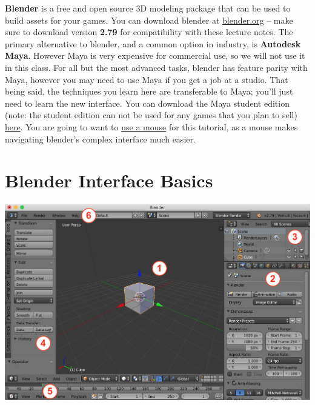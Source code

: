 \documentclass[11pt]{article}
\begin{document}
\textbf{Blender} is a free and open source 3D modeling package that can be used to build assets for
your games.  You can download blender at \href{https://blender.org}{blender.org} -- make sure to
download version {\bf 2.79} for compatibility with these lecture notes.  The primary alternative to
blender, and a common option in industry, is \textbf{Autodesk Maya}.  However Maya is very expensive
for commercial use, so we will not use it in this class.  For all but the most advanced tasks,
blender has feature parity with Maya, however you may need to use Maya if you get a job at a studio.
That being said, the techniques you learn here are transferable to Maya; you'll just need to learn
the new interface.  You can download the Maya student edition (note: the student edition can not be used
for any games that you plan to sell) \href{https://www.autodesk.com/education/free-software/maya}{here}.
You are going to want to \underline{use a mouse} for this tutorial, as a mouse makes navigating 
blender's complex interface much easier.

\section{Blender Interface Basics}

{
\centering \noindent
\includegraphics[width=1.0\textwidth]{blender-interface}
}
\end{document}
